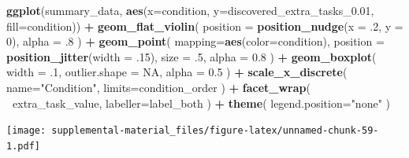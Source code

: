 \documentclass[]{book}
\newenvironment{Shaded}{\begin{snugshade}}{\end{snugshade}}
\newcommand{\DataTypeTok}[1]{\textcolor[rgb]{0.13,0.29,0.53}{#1}}
\newcommand{\DecValTok}[1]{\textcolor[rgb]{0.00,0.00,0.81}{#1}}
\newcommand{\FloatTok}[1]{\textcolor[rgb]{0.00,0.00,0.81}{#1}}
\newcommand{\KeywordTok}[1]{\textcolor[rgb]{0.13,0.29,0.53}{\textbf{#1}}}
\newcommand{\NormalTok}[1]{#1}
\newcommand{\OperatorTok}[1]{\textcolor[rgb]{0.81,0.36,0.00}{\textbf{#1}}}
\newcommand{\OtherTok}[1]{\textcolor[rgb]{0.56,0.35,0.01}{#1}}
\newcommand{\StringTok}[1]{\textcolor[rgb]{0.31,0.60,0.02}{#1}}
\begin{document}
\begin{Shaded}
\begin{Highlighting}[]
\KeywordTok{ggplot}\NormalTok{(summary_data, }\KeywordTok{aes}\NormalTok{(}\DataTypeTok{x=}\NormalTok{condition, }\DataTypeTok{y=}\NormalTok{discovered_extra_tasks_}\FloatTok{0.01}\NormalTok{, }\DataTypeTok{fill=}\NormalTok{condition)) }\OperatorTok{+}
\StringTok{  }\KeywordTok{geom_flat_violin}\NormalTok{(}
    \DataTypeTok{position =} \KeywordTok{position_nudge}\NormalTok{(}\DataTypeTok{x =} \FloatTok{.2}\NormalTok{, }\DataTypeTok{y =} \DecValTok{0}\NormalTok{),}
    \DataTypeTok{alpha =} \FloatTok{.8}
\NormalTok{  ) }\OperatorTok{+}
\StringTok{  }\KeywordTok{geom_point}\NormalTok{(}
    \DataTypeTok{mapping=}\KeywordTok{aes}\NormalTok{(}\DataTypeTok{color=}\NormalTok{condition),}
    \DataTypeTok{position =} \KeywordTok{position_jitter}\NormalTok{(}\DataTypeTok{width =} \FloatTok{.15}\NormalTok{),}
    \DataTypeTok{size =} \FloatTok{.5}\NormalTok{,}
    \DataTypeTok{alpha =} \FloatTok{0.8}
\NormalTok{  ) }\OperatorTok{+}
\StringTok{  }\KeywordTok{geom_boxplot}\NormalTok{(}
    \DataTypeTok{width =} \FloatTok{.1}\NormalTok{,}
    \DataTypeTok{outlier.shape =} \OtherTok{NA}\NormalTok{,}
    \DataTypeTok{alpha =} \FloatTok{0.5}
\NormalTok{  ) }\OperatorTok{+}
\StringTok{  }\KeywordTok{scale_x_discrete}\NormalTok{(}
    \DataTypeTok{name=}\StringTok{"Condition"}\NormalTok{,}
    \DataTypeTok{limits=}\NormalTok{condition_order}
\NormalTok{  ) }\OperatorTok{+}
\StringTok{  }\KeywordTok{facet_wrap}\NormalTok{(}
    \OperatorTok{~}\NormalTok{extra_task_value,}
    \DataTypeTok{labeller=}\NormalTok{label_both}
\NormalTok{  ) }\OperatorTok{+}
\StringTok{  }\KeywordTok{theme}\NormalTok{(}
    \DataTypeTok{legend.position=}\StringTok{"none"}
\NormalTok{  )}
\end{Highlighting}
\end{Shaded}

\texttt{[image: supplemental-material\_files/figure-latex/unnamed-chunk-59-1.pdf]}

\begin{Shaded}
\end{Shaded}
\end{document}

